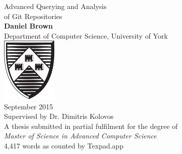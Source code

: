 \documentclass[11pt]{book}
\begin{document}
\begin{titlepage}
	\begin{center}
		{\huge Advanced Querying and Analysis\\ of Git Repositories\\}
		\vspace{1.5cm}
		{\Large \textbf{Daniel Brown} \\}
		{\Large Department of Computer Science, University of York \\}
		\vspace{1.5cm}
		\includegraphics[width=100px]{images/university-of-york-shield} \\
		\vspace{1.5cm}
		{\Large September 2015 \\}
		\vspace{1.5cm}
		\Large Supervised by Dr. Dimitris Kolovos \\
		\vspace{1.5cm}
		\Large A thesis submitted in partial fulfilment for the degree of \\ \textit{Master of Science in Advanced Computer Science}\\
		\vspace{5cm}
		\small 4,417 words as counted by Texpad.app
	\end{center}
	\restoregeometry
\end{titlepage}
\end{document}
